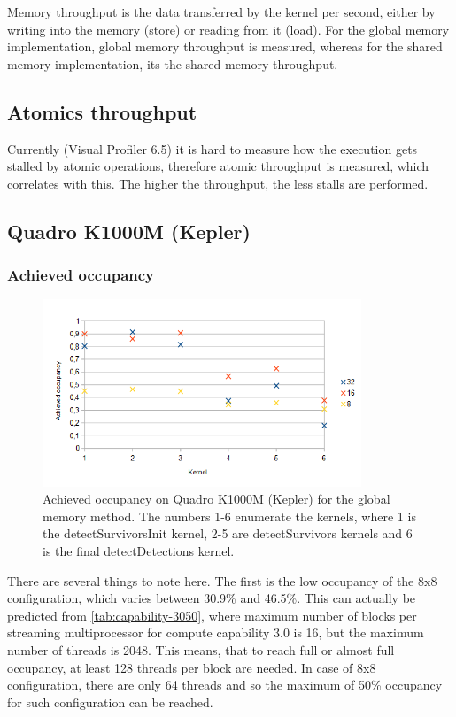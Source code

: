 Memory throughput is the data transferred by the kernel per second, either by writing into the memory (store) or reading from it (load). For the global memory implementation, global memory throughput is measured, whereas for the shared memory implementation, its the shared memory throughput.

\subsection{Atomics throughput}\label{subsec:atomics-throughput}

Currently (Visual Profiler 6.5) it is hard to measure how the execution gets stalled by atomic operations, therefore atomic throughput is measured, which correlates with this. The higher the throughput, the less stalls are performed.

\subsection{Quadro K1000M (Kepler)}

\subsubsection{Achieved occupancy}\label{subsubsec:ach-occupancy}

\begin{figure}[h]
	\centering\includegraphics[width=0.85\textwidth]{fig/achievedoc_quadro.png}
	\caption{Achieved occupancy on Quadro K1000M (Kepler) for the global memory method. The numbers 1-6 enumerate the kernels, where 1 is the detectSurvivorsInit kernel, 2-5 are detectSurvivors kernels and 6 is the final detectDetections kernel.}
	\label{fig:occupancy-quadro}
\end{figure}

There are several things to note here. The first is the low occupancy of the 8x8 configuration, which varies between 30.9\% and 46.5\%. This can actually be predicted from \ref{tab:capability-3050}, where maximum number of blocks per streaming multiprocessor for compute capability 3.0 is 16, but the maximum number of threads is 2048. This means, that to reach full or almost full occupancy, at least 128 threads per block are needed. In case of 8x8 configuration, there are only 64 threads and so the maximum of 50\% occupancy for such configuration can be reached.

